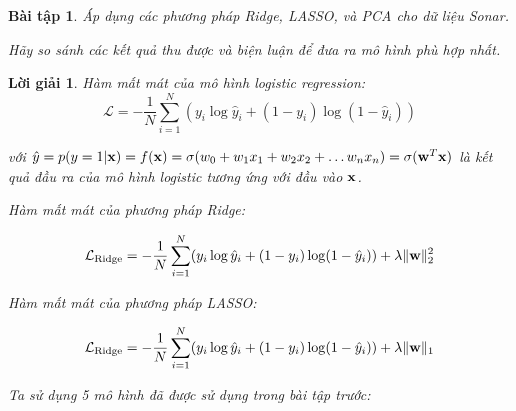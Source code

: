 \documentclass[14pt, a4paper]{article}
\theoremstyle{sltheorem}
\newtheorem{baitap}{Bài tập}
\theoremstyle{soltheorem}
\newtheorem*{loigiai}{Lời giải}
\begin{document}
\begin{titlepage}





    \vfill %

\end{titlepage}

\nocite{*}

\newpage

\begin{baitap}
    Áp dụng các phương pháp Ridge, LASSO, và PCA cho dữ liệu Sonar.

    Hãy so sánh các kết quả thu được và biện luận để đưa ra mô hình phù hợp nhất.
\end{baitap}

\begin{loigiai}
    Hàm mất mát của mô hình logistic regression:
    \begin{equation*}
        \mathcal{L} = -\dfrac{1}{N}\sum_{i=1}^N (y_i \log \hat{y}_i + (1-y_i)\log(1-\hat{y}_i)) 
    \end{equation*}

    với $\hat{y}=p(y=1\vert \bold{x})=f(\bold{x}) = \sigma(w_0 + w_1 x_1 + w_2 x_2 + \dots w_n x_n) = \sigma(\bold{w}^T \bold{x})$ là kết quả đầu ra của mô hình logistic tương ứng với đầu vào $\bold{x}$.

    Hàm mất mát của phương pháp Ridge:

    \begin{equation*}
        \mathcal{L}_{\mathrm{Ridge}} = -\dfrac{1}{N}\sum_{i=1}^N (y_i \log \hat{y}_i + (1-y_i)\log(1-\hat{y}_i)) + \lambda \lVert \bold{w} \rVert_2^2
    \end{equation*}

    Hàm mất mát của phương pháp LASSO:

    \begin{equation*}
        \mathcal{L}_{\mathrm{Ridge}} = -\dfrac{1}{N}\sum_{i=1}^N (y_i \log \hat{y}_i + (1-y_i)\log(1-\hat{y}_i)) + \lambda \lVert \bold{w} \rVert_1
    \end{equation*}

    Ta sử dụng 5 mô hình đã được sử dụng trong bài tập trước:
    
\end{loigiai}
\end{document}
